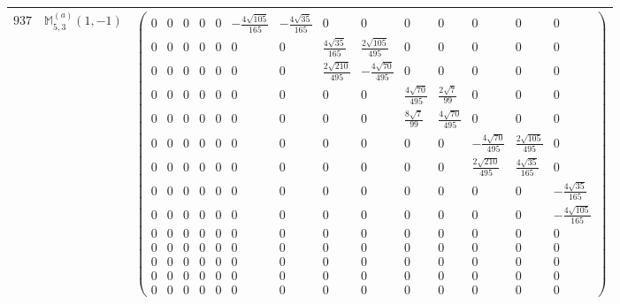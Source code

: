 \documentclass[fleqn,8pt,landscape]{jsarticle}
\begin{document}
\begin{center}
\begin{longtable}{ccc}
$ 937 $ & $ \mathbb{M}_{5,3}^{(a)}(1,-1) $ & $ \begin{pmatrix} 0 & 0 & 0 & 0 & 0 & - \frac{4 \sqrt{105}}{165} & - \frac{4 \sqrt{35}}{165} & 0 & 0 & 0 & 0 & 0 & 0 & 0 \\ 0 & 0 & 0 & 0 & 0 & 0 & 0 & \frac{4 \sqrt{35}}{165} & \frac{2 \sqrt{105}}{495} & 0 & 0 & 0 & 0 & 0 \\ 0 & 0 & 0 & 0 & 0 & 0 & 0 & \frac{2 \sqrt{210}}{495} & - \frac{4 \sqrt{70}}{495} & 0 & 0 & 0 & 0 & 0 \\ 0 & 0 & 0 & 0 & 0 & 0 & 0 & 0 & 0 & \frac{4 \sqrt{70}}{495} & \frac{2 \sqrt{7}}{99} & 0 & 0 & 0 \\ 0 & 0 & 0 & 0 & 0 & 0 & 0 & 0 & 0 & \frac{8 \sqrt{7}}{99} & \frac{4 \sqrt{70}}{495} & 0 & 0 & 0 \\ 0 & 0 & 0 & 0 & 0 & 0 & 0 & 0 & 0 & 0 & 0 & - \frac{4 \sqrt{70}}{495} & \frac{2 \sqrt{105}}{495} & 0 \\ 0 & 0 & 0 & 0 & 0 & 0 & 0 & 0 & 0 & 0 & 0 & \frac{2 \sqrt{210}}{495} & \frac{4 \sqrt{35}}{165} & 0 \\ 0 & 0 & 0 & 0 & 0 & 0 & 0 & 0 & 0 & 0 & 0 & 0 & 0 & - \frac{4 \sqrt{35}}{165} \\ 0 & 0 & 0 & 0 & 0 & 0 & 0 & 0 & 0 & 0 & 0 & 0 & 0 & - \frac{4 \sqrt{105}}{165} \\ 0 & 0 & 0 & 0 & 0 & 0 & 0 & 0 & 0 & 0 & 0 & 0 & 0 & 0 \\ 0 & 0 & 0 & 0 & 0 & 0 & 0 & 0 & 0 & 0 & 0 & 0 & 0 & 0 \\ 0 & 0 & 0 & 0 & 0 & 0 & 0 & 0 & 0 & 0 & 0 & 0 & 0 & 0 \\ 0 & 0 & 0 & 0 & 0 & 0 & 0 & 0 & 0 & 0 & 0 & 0 & 0 & 0 \\ 0 & 0 & 0 & 0 & 0 & 0 & 0 & 0 & 0 & 0 & 0 & 0 & 0 & 0 \end{pmatrix} $ \\ \hline

\end{longtable}
\end{center}
\end{document}

